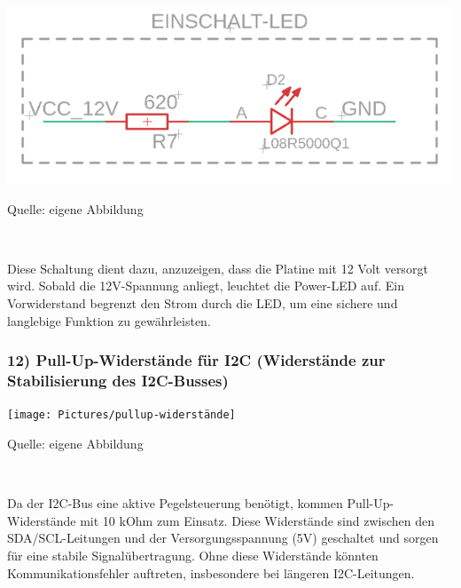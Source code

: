 \documentclass[ngerman,12pt,a4paper]{article}
\begin{document}
		\begin{center} 
			\begin{minipage}[t]{0.8\textwidth}
				\includegraphics{Pictures/einschalt-led}
				\label{fig: einschalt-led}
				\vspace{-10pt}
				\begin{center}
					\par\small Quelle: eigene Abbildung
				\end{center}
			\end{minipage} \\[0.75cm]
		\end{center}
		Diese Schaltung dient dazu, anzuzeigen, dass die Platine mit 12 Volt versorgt wird. Sobald die 12V-Spannung anliegt, leuchtet die Power-LED auf. Ein Vorwiderstand begrenzt den Strom durch die LED, um eine sichere und langlebige Funktion zu gewährleisten.
		
		\subsubsection*{12) Pull-Up-Widerstände für I2C (Widerstände zur Stabilisierung des I2C-Busses)}
		
		\begin{center} 
			\begin{minipage}[t]{0.65\textwidth}
				\texttt{[image: Pictures/pullup-widerstände]}
				\label{fig: pullup-widerstände}
				\vspace{-10pt}
				\begin{center}
					\par\small Quelle: eigene Abbildung
				\end{center}
			\end{minipage} \\[0.75cm]
		\end{center}
		Da der I2C-Bus eine aktive Pegelsteuerung benötigt, kommen Pull-Up-Widerstände mit 10 kOhm zum Einsatz. Diese Widerstände sind zwischen den SDA/SCL-Leitungen und der Versorgungsspannung (5V) geschaltet und sorgen für eine stabile Signalübertragung.
		Ohne diese Widerstände könnten Kommunikationsfehler auftreten, insbesondere bei längeren I2C-Leitungen. 
		
\end{document}
